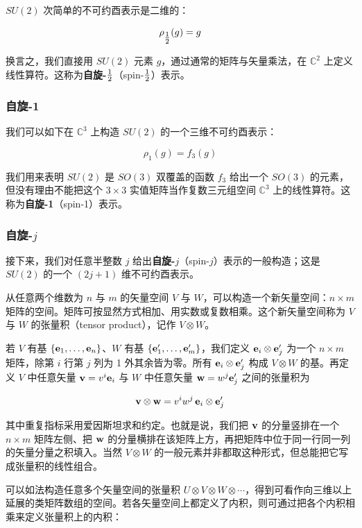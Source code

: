$SU(2)$ 次简单的不可约酉表示是二维的：

\[
\rho_{\tfrac{1}{2}}(g)=g
\]

换言之，我们直接用 $SU(2)$ 元素 $g$，通过通常的矩阵与矢量乘法，在 $\mathbb{C}^{2}$ 上定义线性算符。这称为\textbf{自旋-$\tfrac{1}{2}$}（spin-$\tfrac{1}{2}$）表示。

\subsubsection{自旋-1}

我们可以如下在 $\mathbb{C}^{3}$ 上构造 $SU(2)$ 的一个三维不可约酉表示：

\[
\rho_{1}(g)=f_{3}(g)
\]

我们用来表明 $SU(2)$ 是 $SO(3)$ 双覆盖的函数 $f_{3}$ 给出一个 $SO(3)$ 的元素，但没有理由不能把这个 $3\times3$ 实值矩阵当作复数三元组空间 $\mathbb{C}^{3}$ 上的线性算符。这称为\textbf{自旋-1}（spin-1）表示。

\subsubsection{自旋-$j$}

接下来，我们对任意半整数 $j$ 给出\textbf{自旋-$j$}（spin-$j$）表示的一般构造；这是 $SU(2)$ 的一个 $(2j+1)$ 维不可约酉表示。

从任意两个维数为 $n$ 与 $m$ 的矢量空间 $V$ 与 $W$，可以构造一个新矢量空间：$n\times m$ 矩阵的空间。矩阵可按显然方式相加、用实数或复数相乘。这个新矢量空间称为 $V$ 与 $W$ 的张量积（tensor product），记作 $V\otimes W$。

若 $V$ 有基 $\{\mathbf{e}_{1},\dots,\mathbf{e}_{n}\}$、$W$ 有基 $\{\mathbf{e}'_{1},\dots,\mathbf{e}'_{m}\}$，我们定义 $\mathbf{e}_{i}\otimes\mathbf{e}'_{j}$ 为一个 $n\times m$ 矩阵，除第 $i$ 行第 $j$ 列为 1 外其余皆为零。所有 $\mathbf{e}_{i}\otimes\mathbf{e}'_{j}$ 构成 $V\otimes W$ 的基。再定义 $V$ 中任意矢量 $\mathbf{v}=v^{i}\mathbf{e}_{i}$ 与 $W$ 中任意矢量 $\mathbf{w}=w^{j}\mathbf{e}'_{j}$ 之间的张量积为

\[
\mathbf{v}\otimes\mathbf{w}=v^{i}w^{j}\,\mathbf{e}_{i}\otimes\mathbf{e}'_{j}
\]

其中重复指标采用爱因斯坦求和约定。也就是说，我们把 $\mathbf{v}$ 的分量竖排在一个 $n\times m$ 矩阵左侧、把 $\mathbf{w}$ 的分量横排在该矩阵上方，再把矩阵中位于同一行同一列的矢量分量之积填入。当然 $V\otimes W$ 的一般元素并非都取这种形式，但总能把它写成张量积的线性组合。

可以如法构造任意多个矢量空间的张量积 $U\otimes V\otimes W\otimes\cdots$，得到可看作向三维以上延展的类矩阵数组的空间。若各矢量空间上都定义了内积，则可通过把各个内积相乘来定义张量积上的内积：


